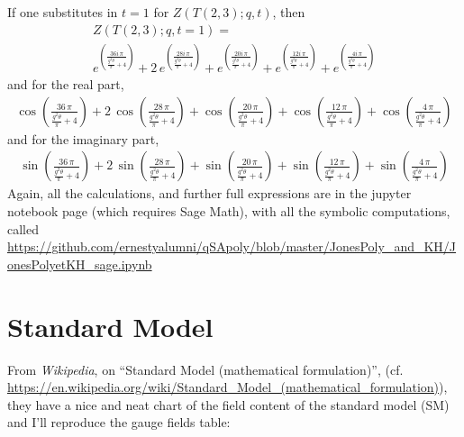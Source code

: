 \documentclass[10pt]{amsart}
\begin{document}
  If one substitutes in $t=1$ for $Z(T(2,3);q,t)$, then
  \[
\begin{gathered}
  Z(T(2,3);q,t=1) = \\
e^{\left(\frac{36 i \, \pi}{\frac{g^{2} \theta}{\pi} + 4}\right)} + 2 \, e^{\left(\frac{28 i \, \pi}{\frac{g^{2} \theta}{\pi} + 4}\right)} + e^{\left(\frac{20 i \, \pi}{\frac{g^{2} \theta}{\pi} + 4}\right)} + e^{\left(\frac{12 i \, \pi}{\frac{g^{2} \theta}{\pi} + 4}\right)} + e^{\left(\frac{4 i \, \pi}{\frac{g^{2} \theta}{\pi} + 4}\right)}
\end{gathered}
\]
and for the real part,
\[
\begin{gathered}
  \cos\left(\frac{36 \, \pi}{\frac{g^{2} \theta}{\pi} + 4}\right) + 2 \, \cos\left(\frac{28 \, \pi}{\frac{g^{2} \theta}{\pi} + 4}\right) + \cos\left(\frac{20 \, \pi}{\frac{g^{2} \theta}{\pi} + 4}\right) + \cos\left(\frac{12 \, \pi}{\frac{g^{2} \theta}{\pi} + 4}\right) + \cos\left(\frac{4 \, \pi}{\frac{g^{2} \theta}{\pi} + 4}\right)
  \end{gathered}
\]
and for the imaginary part,
\[
\begin{gathered}
\sin\left(\frac{36 \, \pi}{\frac{g^{2} \theta}{\pi} + 4}\right) + 2 \, \sin\left(\frac{28 \, \pi}{\frac{g^{2} \theta}{\pi} + 4}\right) + \sin\left(\frac{20 \, \pi}{\frac{g^{2} \theta}{\pi} + 4}\right) + \sin\left(\frac{12 \, \pi}{\frac{g^{2} \theta}{\pi} + 4}\right) + \sin\left(\frac{4 \, \pi}{\frac{g^{2} \theta}{\pi} + 4}\right)
  \end{gathered}
\]
Again, all the calculations, and further full expressions are in the jupyter notebook page (which requires Sage Math), with all the symbolic computations, called \url{https://github.com/ernestyalumni/qSApoly/blob/master/JonesPoly_and_KH/JonesPolyetKH_sage.ipynb}






\section{Standard Model}

From \emph{Wikipedia}, on ``Standard Model (mathematical formulation)'', (cf. \url{https://en.wikipedia.org/wiki/Standard_Model_(mathematical_formulation)}), they have a nice and neat chart of the field content of the standard model (SM) and I'll reproduce the gauge fields table:
\end{document}
